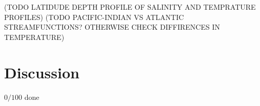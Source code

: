 \documentclass[a4paper]{article}
\begin{document}
\begin{multicols}{2}

(TODO LATIDUDE DEPTH PROFILE OF SALINITY AND TEMPRATURE PROFILES)
(TODO PACIFIC-INDIAN VS ATLANTIC STREAMFUNCTIONS? OTHERWISE CHECK DIFFIRENCES IN TEMPERATURE)


\section{Discussion}

$0/100$ done


%

\printbibliography

\end{multicols}
\end{document}
